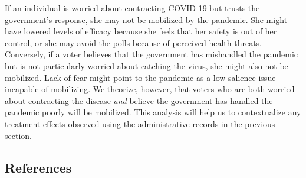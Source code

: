 \documentclass[
  12pt,
]{article}
\begin{document}
If an individual is worried about contracting COVID-19 but trusts the government's response, she may not be mobilized by the pandemic. She might have lowered levels of efficacy because she feels that her safety is out of her control, or she may avoid the polls because of perceived health threats. Conversely, if a voter believes that the government has mishandled the pandemic but is not particularly worried about catching the virus, she might also not be mobilized. Lack of fear might point to the pandemic as a low-salience issue incapable of mobilizing. We theorize, however, that voters who are both worried about contracting the disease \emph{and} believe the government has handled the pandemic poorly will be mobilized. This analysis will help us to contextualize any treatment effects observed using the administrative records in the previous section.

\newpage

\hypertarget{references}{%
\subsection*{References}\label{references}}
\end{document}
